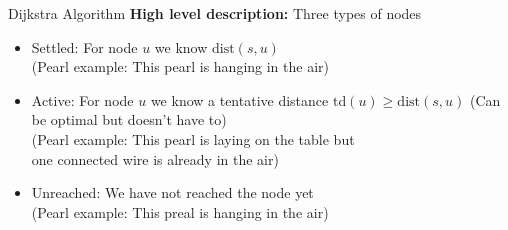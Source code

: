 \begin{frame}{Dijkstra Algorithm}
  \textbf{High level description:}
  Three types of nodes
  \begin{itemize}
    \item
      {\color{Mittel-Blau}Settled:}
      For node {\color{Mittel-Blau}$u$} we know
      {\color{Mittel-Blau}$\mathrm{dist}(s, u)$}
      \hfill
      \\
      {\color{gray}(Pearl example: This pearl is hanging in the air)}
      \vspace{0.5em}
    \item
      {\color{Mittel-Blau}Active:}
      For node {\color{Mittel-Blau}$u$} we know a tentative distance
      {\color{Mittel-Blau}$\mathrm{td}(u) \geq \mathrm{dist}(s, u)$}
      (Can be optimal but doesn't have to)
      \hfill
      \\
      {\color{gray}(Pearl example: This pearl is laying on the table but\\
        one connected wire is already in the air)}
        \vspace{0.5em}
    \item
      {\color{Mittel-Blau}Unreached:}
      We have not reached the node yet
      \hfill
      \\
        {\color{gray}(Pearl example: This preal is hanging in the air)}
  \end{itemize}
\end{frame}



